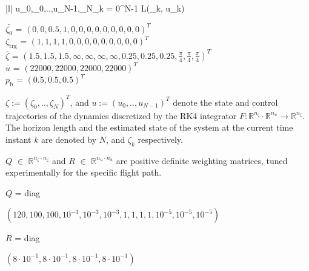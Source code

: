 \documentclass[conference]{IEEEtran}
\begin{document}
\begin{mini!}|l|
	{u_0,\zeta_0,..,u_{N-1},\zeta_N}{\sum_{k = 0}^{N-1} L\left(\zeta_{k}, u_k\right)}{{\label{OCP}}}{}
\end{mini!}

\begin{flushleft}
$\bar{\zeta_0}$ \hspace{0.18in}= $(0, 0, 0.5, 1, 0, 0, 0, 0, 0, 0, 0, 0, 0)^T$\\
$\zeta_{\mathrm{trg}}$ \hspace{0.08in}= $( 1, 1, 1, 1, 0, 0, 0, 0, 0, 0, 0, 0, 0)^T$\\
$\overline{\zeta}$ \hspace{0.03in}= $(1.5,1.5,1.5,\infty,\infty,\infty,\infty,0.25,0.25,0.25,\frac{\pi}{4},\frac{\pi}{4},\frac{\pi}{4})^T$\\
$\overline{u}$ = $(22000, 22000, 22000, 22000)^T$\\
$p_\mathrm{b}$ \hspace{0.18in}= $(0.5, 0.5, 0.5)^T$\\
\end{flushleft}

 $\zeta := (\zeta_0, .., \zeta_N)^T$, and $u := (u_0, .., u_{N-1})^T$ denote the state and control trajectories of the dynamics discretized by the RK4 integrator $F :\mathbb{R}^{n_{\zeta}} \cdot \mathbb{R}^{n_{u}} \rightarrow \mathbb{R}^{n_{\zeta}}$. The horizon length and the estimated state of the system at the current time instant $k$ are denoted by $N$, and $\zeta_k$ respectively.

 $Q$ $\in$ $\mathbb{R}^{n_{\zeta} \cdot n_{\zeta}}$ and $R$ $\in$ $\mathbb{R}^{n_{u} \cdot n_{u}}$ are positive definite weighting matrices, tuned experimentally for the specific flight path.
\begin{flushleft}
\begin{small}
$Q$ = diag\begin{footnotesize}$(120, 100, 100, 10^{-3}, 10^{-3},10^{-3},1, 1, 1, 1, 10^{-5}, 10^{-5}, 10^{-5})$\\
\end{footnotesize}
$R$ = diag\begin{footnotesize}$(8 \cdot 10^{-1}, 8\cdot 10^{-1}, 8\cdot 10^{-1}, 8\cdot 10^{-1})$\\
\end{footnotesize}
\end{small}
\end{flushleft}
\end{document}
